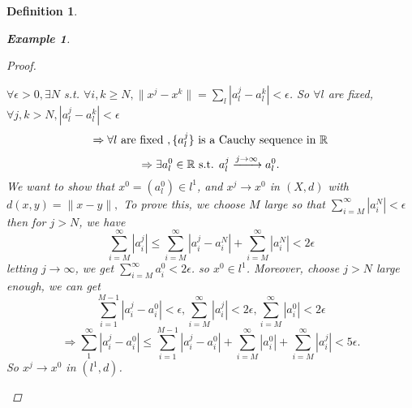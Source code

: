 \documentclass{article}
\newtheorem*{definition}{Definition}
\newtheorem*{example}{Example}
\begin{document}
\begin{definition}
\begin{example}
\begin{enumerate}
\begin{proof}
\begin{itemize}
                    $\forall \epsilon > 0, \exists N$ s.t. $\forall i, k \ge N, \|x^j - x^k\| = \sum_{l}|a_l^j - a_l^k| < \epsilon$.
                    So $\forall l$ are fixed, $\forall j, k > N, |a_l^j - a_l^k| < \epsilon$
                    \[
                       \Rightarrow \forall l \textnormal{ are fixed }, \{a_l^j\} \textnormal{ is a Cauchy sequence in }\mathbb{R} 
                    \]
                    \[
                        \Rightarrow \exists a_l^0 \in \mathbb{R} \textnormal{ s.t. } a_l^j \xrightarrow{j \rightarrow \infty} a_l^0.
                    \]
                    We want to show that $x^0=(a_l^0) \in l^1$, and $x^j \rightarrow x^0$ in $(X, d)$ with $d(x, y) = \|x -y\|, $
                    To prove this, we choose $M$ large so that $\sum_{i=M}^{\infty}{|a_i^N|} < \epsilon$
                    then for $j > N$, we have
                    \[
                        \sum_{i=M}^{\infty}{|a_i^j|} \le \sum_{i=M}^{\infty}{|a_i^j - a_i^N| + \sum_{i=M}^{\infty}{|a_i^N|}} < 2 \epsilon
                    \]
                    letting $j \rightarrow \infty$, we get $\sum_{i=M}^{\infty}{a_i^0} < 2 \epsilon$. so $x^0 \in l^1$.
                    Moreover, choose $j > N$ large enough, we can get
                    \[
                        \sum_{i=1}^{M-1}{|a_i^j - a_i^0|} < \epsilon,
                        \sum_{i=M}^{\infty}{|a_i^j|} < 2\epsilon,
                        \sum_{i=M}^{\infty}{|a_i^0|} < 2\epsilon
                    \]
                    \[
                        \Rightarrow \sum_{1}^{\infty}{|a_i^j - a_i^0|} \le \sum_{i=1}^{M-1}{|a_i^j - a_i^0|} + \sum_{i=M}^{\infty}{|a_i^0|} + \sum_{i=M}^{\infty}{|a_i^j|} < 5 \epsilon.
                    \]
                    So $x^j \rightarrow x^0$ in $(l^1, d)$.
                \end{itemize}        
            \end{proof}
        \end{enumerate}
    \end{example}
\end{definition}
\end{document}

